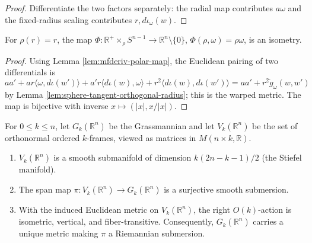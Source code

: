 \begin{proof}
\leanok
\sketch Differentiate the two factors separately: the radial map contributes $a\omega$ and the fixed-radius scaling contributes $r,d\iota_\omega(w)$.
\end{proof}

\begin{proposition}\label{prop:warped-product-isometry}
\leanok
{}
For $\rho(r)=r$, the map
$\Phi:\mathbb R^+\times_\rho S^{n-1}\to\mathbb R^n\setminus\{0\}$,
$\Phi(\rho,\omega)=\rho\omega$, is an isometry.
\end{proposition}

\begin{proof}
\leanok
{}
\sketch Using Lemma \ref{lem:mfderiv-polar-map}, the Euclidean pairing of two differentials is
\[
aa'+ar\langle\omega,d\iota(w')\rangle+a'r\langle d\iota(w),\omega\rangle+r^2\langle d\iota(w),d\iota(w')\rangle
=aa'+r^2\mathring g_\omega(w,w')
\]
by Lemma \ref{lem:sphere-tangent-orthogonal-radius}; this is the warped metric. The map is bijective with inverse $x\mapsto(|x|,x/|x|)$.
\end{proof}

\begin{proposition}\label{prop:grassmann-stiefel-manifolds}
For $0\le k\le n$, let $G_k(\mathbb R^n)$ be the Grassmannian and let $V_k(\mathbb R^n)$ be the set of orthonormal ordered $k$-frames, viewed as matrices in $M(n\times k,\mathbb R)$.
\begin{enumerate}
\item[(a)] $V_k(\mathbb R^n)$ is a smooth submanifold of dimension
$k(2n-k-1)/2$ (the Stiefel manifold).
\item[(b)] The span map $\pi:V_k(\mathbb R^n)\to G_k(\mathbb R^n)$ is a
surjective smooth submersion.
\item[(c)] With the induced Euclidean metric on $V_k(\mathbb R^n)$, the right
$O(k)$-action is isometric, vertical, and fiber-transitive. Consequently,
$G_k(\mathbb R^n)$ carries a unique metric making $\pi$ a Riemannian
submersion.
\end{enumerate}
\end{proposition}

